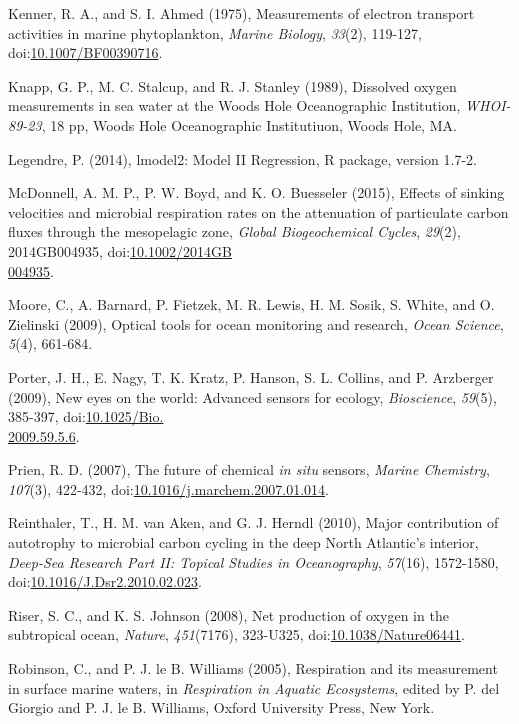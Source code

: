 \begin{singlespace}
{{Kenner, R. A., and S. I. Ahmed (1975), Measurements of electron transport activities in marine phytoplankton, \emph{Marine Biology}, \emph{33}(2), 119-127, doi:\href{http://dx.doi.org/10.1007/BF00390716}{10.1007/BF00390716}.

Knapp, G. P., M. C. Stalcup, and R. J. Stanley (1989), Dissolved oxygen measurements in sea water at the Woods Hole Oceanographic Institution, \emph{WHOI-89-23}, 18 pp, Woods Hole Oceanographic Institutiuon, Woods Hole, MA.

Legendre, P. (2014), lmodel2: Model II Regression, R package, version 1.7-2.

McDonnell, A. M. P., P. W. Boyd, and K. O. Buesseler (2015), Effects of sinking velocities and microbial respiration rates on the attenuation of particulate carbon fluxes through the mesopelagic zone, \emph{Global Biogeochemical Cycles}, \emph{29}(2), 2014GB004935, doi:\href{http://dx.doi.org/10.1002/2014GB004935}{10.1002/2014GB\\004935}.

Moore, C., A. Barnard, P. Fietzek, M. R. Lewis, H. M. Sosik, S. White, and O. Zielinski (2009), Optical tools for ocean monitoring and research, \emph{Ocean Science}, \emph{5}(4), 661-684.

Porter, J. H., E. Nagy, T. K. Kratz, P. Hanson, S. L. Collins, and P. Arzberger (2009), New eyes on the world: Advanced sensors for ecology, \emph{Bioscience}, \emph{59}(5), 385-397, doi:\href{http://dx.doi.org/10.1025/Bio.2009.59.5.6}{10.1025/Bio.\\2009.59.5.6}.

Prien, R. D. (2007), The future of chemical \emph{in situ} sensors, \emph{Marine Chemistry}, \emph{107}(3), 422-432, doi:\href{http://dx.doi.org/10.1016/j.marchem.2007.01.014}{10.1016/j.marchem.2007.01.014}.

Reinthaler, T., H. M. van Aken, and G. J. Herndl (2010), Major contribution of autotrophy to microbial carbon cycling in the deep North Atlantic's interior, \emph{Deep-Sea Research Part II: Topical Studies in Oceanography}, \emph{57}(16), 1572-1580, doi:\href{http://dx.doi.org/10.1016/J.Dsr2.2010.02.023}{10.1016/J.Dsr2.2010.02.023}.

Riser, S. C., and K. S. Johnson (2008), Net production of oxygen in the subtropical ocean, \emph{Nature}, \emph{451}(7176), 323-U325, doi:\href{http://dx.doi.org/10.1038/Nature06441}{10.1038/Nature06441}.

Robinson, C., and P. J. le B. Williams (2005), Respiration and its measurement in surface marine waters, in \emph{Respiration in Aquatic Ecosystems}, edited by P. del Giorgio and P. J. le B. Williams, Oxford University Press, New York.

}}
\end{singlespace}
